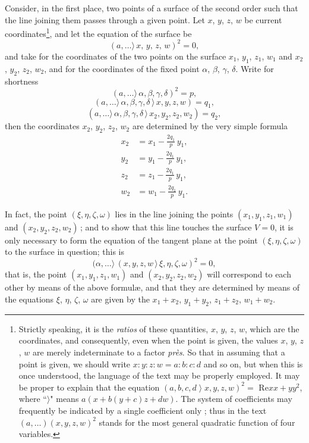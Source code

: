 \documentclass[11pt,a4paper]{article}
\theoremstyle{definition}
\begin{document}
Consider, in the first place, two points of a surface of the second order such that
the line joining them passes through a given point. Let $x$, $y$, $z$, $w$ be current
coordinates\footnote{Strictly speaking, it is the \textit{ratios} of these quantities, $x$, $y$, $z$, $w$, which are the coordinates, and consequently, even when the point is given, the values $x$, $y$, $z$, $w$ are merely indeterminate to a factor \textit{pr\`es}. So that in assuming that a point is given, we should write $x:y:z:w=a:b:c:d$ and so on, but when this is once understood, the language of the text may be properly employed. It may be proper to explain that the equation $(a, b, c, d \;\rangle\; x, y, z, w)^2 = $ Re$xx+yy^2$, where ``$\rangle$" means $a(x+b(y+c)z+dw)$. The system of coefficients may frequently be indicated by a single coefficient only ; thus in the text $(a,\ldots\!)(x,y,z,w)^2$ stands for the most general quadratic function of four variables.}, and let the equation of the surface be
\[
(a,\ldots\!\rangle\,x,\,y,\,z,\,w)^2 = 0,
\]
and take for the coordinates of the two points on the surface $x_1$, $y_1$, $z_1$, $w_1$ and
$x_2$, $y_2$, $z_2$, $w_2$, and for the coordinates of the fixed point $\alpha$, $\beta$, $\gamma$, $\delta$. Write for shortness
\[
(a,\ldots\!\rangle\,\alpha, \beta, \gamma, \delta)^2 = p,
\]
\[
(a,\ldots\!\rangle\,\alpha, \beta, \gamma, \delta\,\rangle\,x, y, z, w) = q_1,
\]
\[
(a,\ldots\!\rangle\,\alpha, \beta, \gamma, \delta\,\rangle\,x_2, y_2, z_2, w_2) = q_2,
\]
then the coordinates $x_2$, $y_2$, $z_2$, $w_2$ are determined by the very simple formula
\begin{align*}
x_2 &= x_1 - \frac{2 q_1}{p}\,y_1, \\
y_2 &= y_1 - \frac{2 q_1}{p}\,y_1, \\
z_2 &= z_1 - \frac{2 q_1}{p}\,y_1, \\
w_2 &= w_1 - \frac{2 q_1}{p}\,y_1.
\end{align*}

\medskip

In fact, the point $(\xi,\eta,\zeta,\omega)$ lies in the line joining the points $(x_1, y_1, z_1, w_1)$ and
$(x_2, y_2, z_2, w_2)$\,; and to show that this line touches the surface $V=0$, it is only
necessary to form the equation of the tangent plane at the point $(\xi,\eta,\zeta,\omega)$ to the
surface in question; this is
\[
(\alpha,\ldots\!\rangle\,(x, y, z, w\,\rangle\,\xi, \eta, \zeta, \omega)^2 = 0,
\]
that is, the point $(x_1, y_1, z_1, w_1)$ and $(x_2, y_2, z_2, w_2)$ will correspond to each other by
means of the above formul\ae, and that they are determined by means of the equations $\xi$, $\eta$, $\zeta$, $\omega$ are given by the
$x_1 + x_2$, $y_1 + y_2$, $z_1 + z_2$, $w_1 + w_2$.
\end{document}
